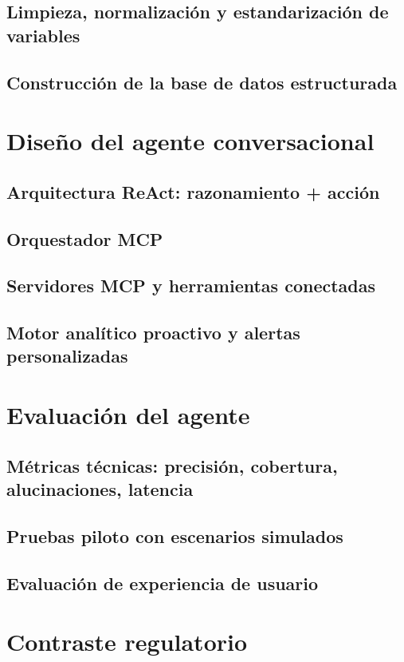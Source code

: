 \documentclass[
	spanish, %
	letterpaper, oneside
]{book}
\begin{document}
\begin{itemize}
\subsection{Limpieza, normalización y estandarización de variables}
\subsection{Construcción de la base de datos estructurada}

\section{Diseño del agente conversacional}
\subsection{Arquitectura ReAct: razonamiento + acción}
\subsection{Orquestador MCP}
\subsection{Servidores MCP y herramientas conectadas}
\subsection{Motor analítico proactivo y alertas personalizadas}

\section{Evaluación del agente}
\subsection{Métricas técnicas: precisión, cobertura, alucinaciones, latencia}
\subsection{Pruebas piloto con escenarios simulados}
\subsection{Evaluación de experiencia de usuario}

\section{Contraste regulatorio}

\end{itemize}
\end{document}
